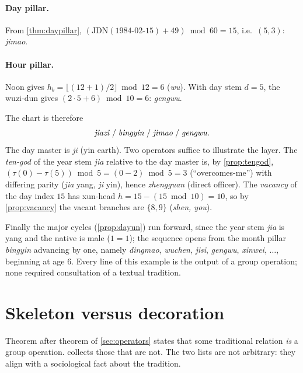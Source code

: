 \documentclass[11pt,a4paper]{article}
\theoremstyle{definition}
\theoremstyle{remark}
\begin{document}
\paragraph{Day pillar.} From \cref{thm:daypillar}, $(\mathrm{JDN}(1984\text{-}02\text{-}15)+49)\bmod60=15$, i.e.\ $(5,3)$: \emph{jimao}.

\paragraph{Hour pillar.} Noon gives $h_b=\lfloor(12+1)/2\rfloor\bmod12=6$ (\emph{wu}). With day stem $d=5$, the wuzi-dun gives $(2\cdot5+6)\bmod10=6$: \emph{gengwu}.

The chart is therefore
\[
\text{\emph{jiazi}}\;/\;\text{\emph{bingyin}}\;/\;\text{\emph{jimao}}\;/\;\text{\emph{gengwu}}.
\]
The day master is \emph{ji} (yin earth). Two operators suffice to illustrate the layer. The \emph{ten-god} of the year stem \emph{jia} relative to the day master is, by \cref{prop:tengod}, $(\tau(0)-\tau(5))\bmod5=(0-2)\bmod5=3$ (``overcomes-me'') with differing parity (\emph{jia} yang, \emph{ji} yin), hence \emph{zhengguan} (direct officer). The \emph{vacancy} of the day index $15$ has xun-head $h=15-(15\bmod10)=10$, so by \cref{prop:vacancy} the vacant branches are $\{8,9\}$ (\emph{shen, you}).

Finally the major cycles (\cref{prop:dayun}) run forward, since the year stem \emph{jia} is yang and the native is male ($1=1$); the sequence opens from the month pillar \emph{bingyin} advancing by one, namely \emph{dingmao}, \emph{wuchen}, \emph{jisi}, \emph{gengwu}, \emph{xinwei}, $\dots$, beginning at age $6$. Every line of this example is the output of a group operation; none required consultation of a textual tradition.

\section{Skeleton versus decoration}\label{sec:skeleton}
Theorem after theorem of \cref{sec:operators} states that some traditional relation \emph{is} a group operation.  collects those that are not. The two lists are not arbitrary: they align with a sociological fact about the tradition.
\end{document}

